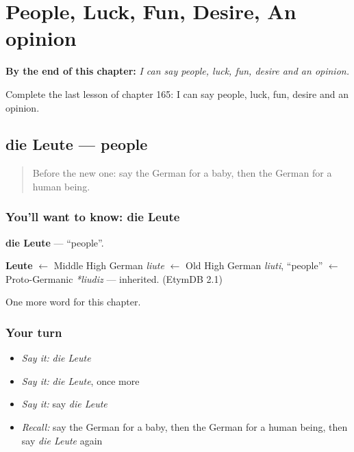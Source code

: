 
\chapter{People, Luck, Fun, Desire, An opinion}
\label{ch:ge-people-luck-fun-desire-an-opinion}

\begin{chapteropening}
\textbf{By the end of this chapter:} \emph{I can say people, luck, fun, desire and an opinion.}

Complete the last lesson of chapter 165: I can say people, luck, fun, desire and an opinion.
\end{chapteropening}

\section[die Leute]{die Leute — people}

\label{lesson:GE-C165-leute}



\begin{quote}
Before the new one: say the German for a baby, then the German for a human being.
\end{quote}

\subsection*{You'll want to know: die Leute}
\textbf{die Leute} — \textquotedblleft{}people\textquotedblright{}.

\begin{cousinweb}
\textbf{Leute} $\leftarrow$ Middle High German \emph{liute} $\leftarrow$ Old High German \emph{liuti}, \textquotedblleft{}people\textquotedblright{} $\leftarrow$ Proto-Germanic \emph{*liudiz} — inherited. (EtymDB 2.1)
\end{cousinweb}

\begin{grammarlens}[title={What you've built}]
One more word for this chapter.
\end{grammarlens}

\subsection*{Your turn}
\begin{itemize}
\raggedright
  \item \emph{Say it:} \emph{die Leute}
  \item \emph{Say it:} \emph{die Leute}, once more
  \item \emph{Say it:} say \emph{die Leute}
  \item \emph{Recall:} say the German for a baby, then the German for a human being, then say \emph{die Leute} again
\end{itemize}

